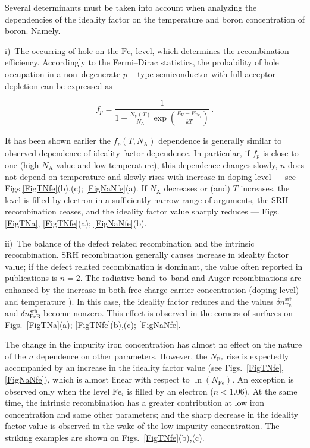 \documentclass[12pt]{article}
\begin{document}
Several determinants must be taken into account when analyzing the dependencies of the ideality factor on the temperature and boron concentration of boron.
Namely.

i)~The occurring of hole on the $\mathrm{Fe}_i$ level, which determines the recombination efficiency.
Accordingly to the Fermi--Dirac statistics,
the probability of hole occupation in  a non--degenerate $p-$type semiconductor with full acceptor depletion
can be expressed as

\begin{equation}
\label{eqfp}
 f_p=\frac{1}{1+\frac{N_V(T)}{N_\mathrm{A}}\exp\left(\frac{E_V-E_{\mathrm{Fe}_i}}{kT}\right)}\,.
\end{equation}

It has been shown earlier \cite{Olikh2018SM}  the $f_p(T,N_\mathrm{A})$ dependence is generally similar to observed dependence of ideality factor dependence.
In particular, if $f_p$ is close to one (high $N_\mathrm{A}$ value and low temperature), this dependence changes slowly,
$n$ does not depend on temperature and slowly rises with increase in doping level --- see Figs.\ref{FigTNfe}(b),(c); \ref{FigNaNfe}(a).
If $N_\mathrm{A}$ decreases or (and) $T$ increases,
the level is filled by electron in a sufficiently narrow range of arguments,
the SRH recombination ceases,
and the ideality factor value sharply  reduces --- Figs.\ref{FigTNa}, \ref{FigTNfe}(a); \ref{FigNaNfe}(b).

ii)~The balance of the defect related recombination and the intrinsic recombination.
SRH recombination generally causes increase in ideality factor value;
if the defect related recombination is dominant, the value often reported in publications is $n=2$.
The radiative band--to--band and Auger recombinations are enhanced by the increase in both free charge carrier concentration
(doping level) and temperature   \cite{Si_BtB,Si_Auger}).
In this case, the ideality factor reduces and the values $\delta n_\mathrm{Fe}^\mathrm{srh}$
and $\delta n_\mathrm{FeB}^\mathrm{srh}$ become nonzero.
This effect is observed in the corners of surfaces on Figs.~\ref{FigTNa}(a); \ref{FigTNfe}(b),(c); \ref{FigNaNfe}.


The change in the impurity iron concentration has almost no effect on the nature of the $n$ dependence on other parameters.
However, the $N_\mathrm{Fe}$ rise is expectedly accompanied by an increase in the ideality factor value (see Figs.~\ref{FigTNfe}, \ref{FigNaNfe}),
which is almost linear with respect to $\ln(N_\mathrm{Fe})$.
An exception is observed only when the level $\mathrm{Fe}_i$  is filled by an electron ($n<1.06$).
At the same time,
the intrinsic recombination has a greater contribution at low iron concentration and same other parameters;
and the sharp decrease in the ideality factor value is observed in the wake of the low impurity concentration.
The striking examples are shown on Figs.~\ref{FigTNfe}(b),(c).
\end{document}

